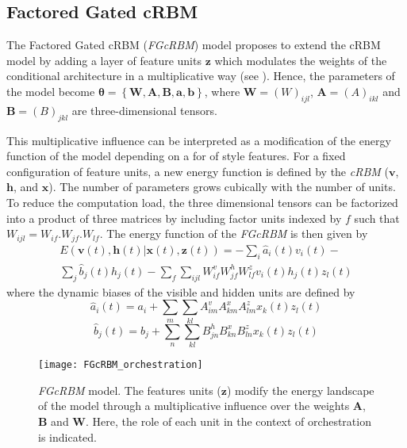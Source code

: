 \documentclass[letterpaper]{article}
\begin{document}
\subsection{Factored Gated cRBM}
The Factored Gated cRBM (\textit{FGcRBM}) model  \cite{taylor2009factored} proposes to extend the cRBM model by adding a layer of feature units $\bm{z}$ which modulates the weights of the conditional architecture in a multiplicative way (see ). Hence, the parameters of the model become $\bm{\theta} = \left\lbrace \bm{W} , \bm{A} , \bm{B} , \bm{a} , \bm{b} \right\rbrace$, where $\bm{W} = (W)_{ijl}$, $\bm{A}=(A)_{ikl}$ and $\bm{B}=(B)_{jkl}$ are three-dimensional tensors.

This multiplicative influence can be interpreted as a modification of the energy function of the model depending on a for of style features. For a fixed configuration of feature units, a new energy function is defined by the \textit{cRBM} ($\bm{v}$, $\bm{h}$, and $\bm{x}$). The number of parameters grows cubically with the number of units. To reduce the computation load, the three dimensional tensors can be factorized into a product of three matrices by including factor units indexed by $f$ such that $W_{ijl} = W_{if} . W_{jf} . W_{lf}$.
The energy function of the \textit{FGcRBM} is then given by
\begin{equation}
\begin{split}
E(\bm{v}(t),\bm{h}(t)|\bm{x}(t),\bm{z}(t)) = - \sum_{i} \hat{a}_{i}(t)v_{i}(t) - \\ \sum_{j} \hat{b}_{j}(t)h_{j}(t)
-\sum_{f}\sum_{ijl} W_{if}^{v} W_{jf}^{h} W_{lf}^{z} v_{i}(t) h_{j}(t) z_{l}(t) 
\end{split}
\end{equation}
where the dynamic biases of the visible and hidden units are defined by
\begin{equation}
\hat{a}_{i}(t) = a_{i} + \sum_{m} \sum_{kl}A_{im}^{v}A_{km}^{x}A_{lm}^{z}x_{k}(t)z_{l}(t)
\end{equation}
\begin{equation}
\hat{b}_{j}(t) = b_{j} + \sum_{n} \sum_{kl}B_{jn}^{h}B_{kn}^{x}B_{ln}^{z}x_{k}(t)z_{l}(t)
\end{equation}

\begin{figure}[ht]
\centering
\texttt{[image: FGcRBM\_orchestration]}
\caption{\textit{FGcRBM} model. The features units ($\bm{z}$) modify the energy landscape of the model through a multiplicative influence over the weights $\bm{A}$, $\bm{B}$ and $\bm{W}$. Here, the role of each unit in the context of orchestration is indicated.}
\label{fig:FGcRBM}
\end{figure}
\end{document}
